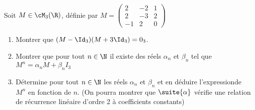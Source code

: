 




\begin{exercice}
Soit $M \in\cM_3(\R) $, définie par 
$ M =\left( 
\begin{array}{ccc}
2 & -2 & 1\\
2 & -3 & 2\\
-1 & 2 & 0
\end{array}
\right)$
\begin{enumerate}
\item Montrer que $(M-\Id_3) (M+3\Id_3)=0_3$.
\item Montrer que pour tout $n\in \N$ il existe des réels $\alpha_n $ et $\beta_n$ tel que $M^n =\alpha_n M +\beta_n I_3$
\item Détermine pour tout $n\in \N$ les réels $\alpha_n$ et $\beta_n$ et en déduire l'expressionde $M^n$ en fonction de $n$.  (On pourra montrer que $\suite{\alpha}$ vérifie une relation de récurrence linéaire d'ordre 2 à coefficients constants) 
\end{enumerate}


\end{exercice}

